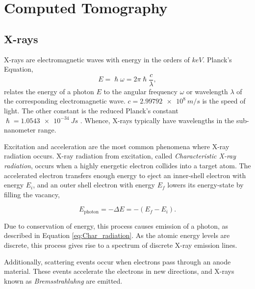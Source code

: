 
\chapter{Computed Tomography}

\section{X-rays}\label{sec:CT_Xrays}

X-rays are electromagnetic waves with energy in the orders of $\unit{keV}$. Planck's Equation,
\begin{equation}\label{eq:Plancks_eq}
    E = \hslash \omega = 2\pi \hslash \frac{c}{\lambda},
\end{equation}
\noindent
relates the energy of a photon $E$ to the angular frequency $\omega$ or wavelength $\lambda$ of the corresponding electromagnetic wave.
$c = \qty{2.99792e8}{m/s}$ is the speed of light.
The other constant is the reduced Planck's constant $\hslash = \qty{1.0543e-34}{Js}$  \cite{blokhin1961physics}.
Whence, X-rays typically have wavelengths in the sub-nanometer range.


Excitation and acceleration are the most common phenomena where X-ray radiation occurs.
X-ray radiation from excitation, called \emph{Characteristic X-ray radiation}, occurs when a highly energetic electron collides into a target atom.
The accelerated electron transfers enough energy to eject an inner-shell electron with energy $E_i$,
and an outer shell electron with energy $E_f$ lowers its energy-state by filling the vacancy,

\begin{equation}\label{eq:Char_radiation}
    E_{\mathrm{photon}} = - \Delta E = - (E_f - E_i).
\end{equation}

Due to conservation of energy, this process causes emission of a photon, as described in Equation \eqref{eq:Char_radiation}.
As the atomic energy levels are discrete, this process gives rise to a spectrum of discrete X-ray emission lines.


Additionally, scattering events occur when electrons pass through an anode material.
These events accelerate the electrons in new directions, and X-rays known as \emph{Bremsstrahluhng} are emitted. %

